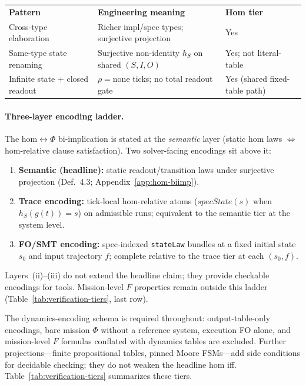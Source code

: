 \begingroup
\renewcommand{\arraystretch}{1.3}
\footnotesize
\begin{tabularx}{\textwidth}{@{}A{0.28\textwidth} A{0.44\textwidth} A{0.24\textwidth}@{}}
    \headingfont\bfseries Pattern & \headingfont\bfseries Engineering meaning & \headingfont\bfseries Hom tier \\
    \addlinespace[2pt]
    Cross-type elaboration & Richer impl/spec types; surjective projection & Yes \\
    \addlinespace[2pt]
    Same-type state renaming & Surjective non-identity $h_S$ on shared $(S,I,O)$ & Yes; not literal-table \\
    \addlinespace[2pt]
    Infinite state + closed readout & $\rho=\text{none}$ ticks; no total readout gate & Yes (shared fixed-table path) \\
\end{tabularx}
\label{tab:pattern-classes}
\endgroup
\vspace{4pt}

\paragraph{Three-layer encoding ladder.}
The hom$\leftrightarrow\Phi$ bi-implication is stated at the \emph{semantic} layer (static hom laws $\Leftrightarrow$ hom-relative clause satisfaction). Two solver-facing encodings sit above it:
\begin{enumerate}[label=(\roman*), leftmargin=2em]
    \item \textbf{Semantic (headline):} static readout/transition laws under surjective projection (Def.~4.3; Appendix~\ref{app:hom-biimp}).
    \item \textbf{Trace encoding:} tick-local hom-relative atoms ($\mathit{specState}(s)$ when $h_S(g(t))=s$) on admissible runs; equivalent to the semantic tier at the system level.
    \item \textbf{FO/SMT encoding:} spec-indexed \texttt{stateLaw} bundles at a fixed initial state $s_0$ and input trajectory $f$; complete relative to the trace tier at each $(s_0,f)$.
\end{enumerate}
Layers~(ii)--(iii) do not extend the headline claim; they provide checkable encodings for tools. Mission-level $F$ properties remain outside this ladder (Table~\ref{tab:verification-tiers}, last row).

The dynamics-encoding schema is required throughout: output-table-only encodings, bare mission $\Phi$ without a reference system, execution FO alone, and mission-level $F$ formulas conflated with dynamics tables are excluded. Further projections---finite propositional tables, pinned Moore FSMs---add side conditions for decidable checking; they do not weaken the headline hom iff. Table~\ref{tab:verification-tiers} summarizes these tiers.

